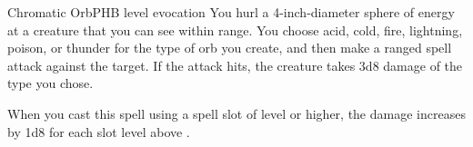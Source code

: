 \begin{spell}{Chromatic Orb}{PHB}{ level evocation}
{
}
You hurl a 4-inch-diameter sphere of energy at a creature
that you can see within range. You choose acid, cold, fire,
lightning, poison, or thunder for the type of orb you
create, and then make a ranged spell attack against the
target. If the attack hits, the creature takes 3d8 damage
of the type you chose.

 When you cast this spell using a
spell slot of  level or higher, the damage increases
by 1d8 for each slot level above .
\end{spell}

